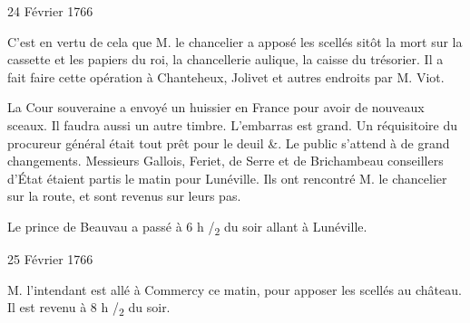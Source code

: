 \begin{diary}{24 Février 1766}{}
        
                         C'est en vertu de cela que M. le chancelier a apposé
                           les scellés sitôt la mort sur la cassette et
                           les papiers du roi,
                              la chancellerie aulique,
                           la caisse du trésorier.
                           Il a fait faire cette
                           opération à Chanteheux, Jolivet et autres
                           endroits par M. Viot.
                        \bigskip
        
        
                        
                           La Cour souveraine a envoyé un huissier en
                           France pour avoir de nouveaux
                           sceaux.
                           Il faudra aussi un autre timbre. L'embarras
                           est grand. Un réquisitoire du procureur général était
                           tout prêt pour le deuil &. Le public
                           s'attend à de grand changements. Messieurs
                           Gallois, Feriet,
                              de Serre et de Brichambeau
                           conseillers d’État étaient partis le matin pour
                           Lunéville. Ils ont
                           rencontré M. le
                              chancelier sur la route, et sont revenus
                           sur leurs pas. \bigskip
        
        
                        
                           Le prince de Beauvau a passé à 6 h
                              /\textsubscript{2} du
                           soir allant à Lunéville.
                        \bigskip
        
        
                     \end{diary}

                     \begin{diary}{25 Février 1766}{}
                        
                        
                           M. l'intendant est allé à
                              Commercy
                           ce matin, pour apposer les scellés au château.
                           Il est revenu à 8 h /\textsubscript{2} du
                           soir. \bigskip
        
        
                     \end{diary}

